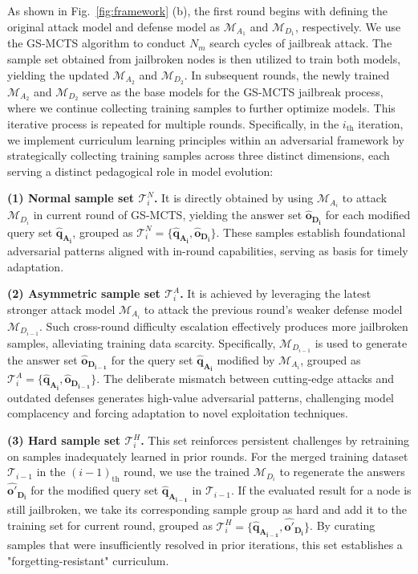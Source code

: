 \documentclass[11pt]{article}
\def\attackmethod{GS-MCTS}
\begin{document}
As shown in Fig.~\ref{fig:framework} (b), the first round begins with defining the original attack model and defense model as $\mathcal{M}_{A_{1}}$ and $\mathcal{M}_{D_{1}}$, respectively. We use the {\attackmethod} algorithm to conduct $N_{m}$ search cycles of jailbreak attack. The sample set obtained from jailbroken nodes is then utilized to train both models, yielding the updated $\mathcal{M}_{A_{2}}$ and $\mathcal{M}_{D_{2}}$. In subsequent rounds, the newly trained $\mathcal{M}_{A_{2}}$ and $\mathcal{M}_{D_{2}}$ serve as the base models for the {\attackmethod} jailbreak process, where we continue collecting training samples to further optimize models. This iterative process is repeated for multiple rounds. Specifically, in the $i_{\mathrm{th}}$ iteration, we implement curriculum learning principles within an adversarial framework by strategically collecting training samples across three distinct dimensions, each serving a distinct pedagogical role in model evolution:
 
\noindent\textbf{(1) Normal sample set $\mathcal{T}^{N}_{i}$.} It is directly obtained by using $\mathcal{M}_{A_{i}}$ to attack $\mathcal{M}_{D_{i}}$ in current round of {\attackmethod}, yielding the answer set $\mathbf{\hat{o}_{D_{i}}}$ for each modified query set $\mathbf{\hat{q}_{A_{i}}}$, grouped as $\mathcal{T}^{N}_{i}=\{\mathbf{\hat{q}_{A_{i}}}, \mathbf{\hat{o}_{D_{i}}}\}$. These samples establish foundational adversarial patterns aligned with in-round capabilities, serving as basis for timely adaptation.

\noindent\textbf{(2) Asymmetric sample set $\mathcal{T}^{A}_{i}$.} It is achieved by leveraging the latest stronger attack model $\mathcal{M}_{A_{i}}$ to attack the previous round's weaker defense model $\mathcal{M}_{D_{i-1}}$. Such cross-round difficulty escalation effectively produces more jailbroken samples, alleviating training data scarcity. Specifically, $\mathcal{M}_{D_{i-1}}$ is used to generate the answer set $\mathbf{\hat{o}_{D_{i-1}}}$ for the query set $\mathbf{\hat{q}_{A_{i}}}$ modified by $\mathcal{M}_{A_{i}}$, grouped as $\mathcal{T}^{A}_{i}=\{\mathbf{\hat{q}_{A_{i}}}, \mathbf{\hat{o}_{D_{i-1}}}\}$. The deliberate mismatch between cutting-edge attacks and outdated defenses generates high-value adversarial patterns, challenging model complacency and forcing adaptation to novel exploitation techniques.

\noindent\textbf{(3) Hard sample set $\mathcal{T}^{H}_{i}$.} This set reinforces persistent challenges by retraining on samples inadequately learned in prior rounds. For the merged training dataset $\mathcal{T}_{i-1}$ in the $(i-1)_{\mathrm{th}}$ round, we use the trained $\mathcal{M}_{D_{i}}$ to regenerate the answers $\mathbf{\hat{o'}_{D_{i}}}$ for the modified query set $\mathbf{\hat{q}_{A_{i-1}}}$ in $\mathcal{T}_{i-1}$. If the evaluated result for a node is still jailbroken, we take its corresponding sample group as hard and add it to the training set for current round, grouped as $\mathcal{T}^{H}_{i}=\{\mathbf{\hat{q}_{A_{i-1}}}, \mathbf{\hat{o'}_{D_{i}}}\}$. By curating samples that were insufficiently resolved in prior iterations, this set establishes a "forgetting-resistant" curriculum.
\end{document}
